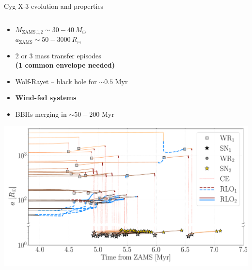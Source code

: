 \documentclass{beamer} %
\begin{document}
\begin{frame}{Cyg X-3 evolution and properties}
	\scriptsize
	\begin{columns}
		\begin{column}{0.6\textwidth}
			\begin{itemize}
				\item $M_{\text{ZAMS,1,2}} \sim 30-40~M_\odot$\\
				$a_{\text{ZAMS}} \sim 50-3000~R_\odot$
				\item 2 or 3 mass transfer episodes \\
				\textbf{(1 common envelope needed)}
				\item Wolf-Rayet -- black hole for $\sim 0.5$ Myr
				\item \textbf{Wind-fed systems}
				\item BBHs merging in $\sim 50-200$ Myr
			\end{itemize}
		\bigskip
		\includegraphics[width=\textwidth]{./images/BWorldtime_Semimajor_BHBH_GW_WRBH_cyg_x-3--Ko17.pdf}
		\end{column}
	

\end{columns}
\end{frame}
\end{document}
